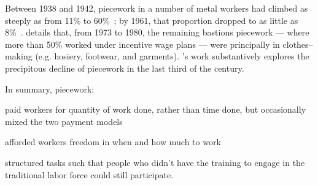 \documentclass[trackingWork]{subfiles}
\begin{document}
Between 1938 and 1942, piecework in a number of metal workers had climbed as steeply as from 11\% to 60\%~\cite{hart2005piecework};
by 1961, that proportion dropped to as little as 8\%~\cite{carlson1982time}.
\citeauthor{carlson1982time} details that, from 1973 to 1980, the remaining bastions piecework
--- where more than 50\% worked under incentive wage plans ---
were principally in clothes--making (e.g. hosiery, footwear, and garments).
\citeauthor{hart2013rise}'s work substantively explores the precipitous decline of piecework in the last third of the  century.



In summary, piecework:
\begin{inlinelist}
  \item paid workers for quantity of work done, rather than time done,
        but occasionally mixed the two payment models
  \item afforded workers freedom in when and how much to work
  \item structured tasks such that people who didn't have the training
        to engage in the traditional labor force could still participate.
\end{inlinelist}
\end{document}
